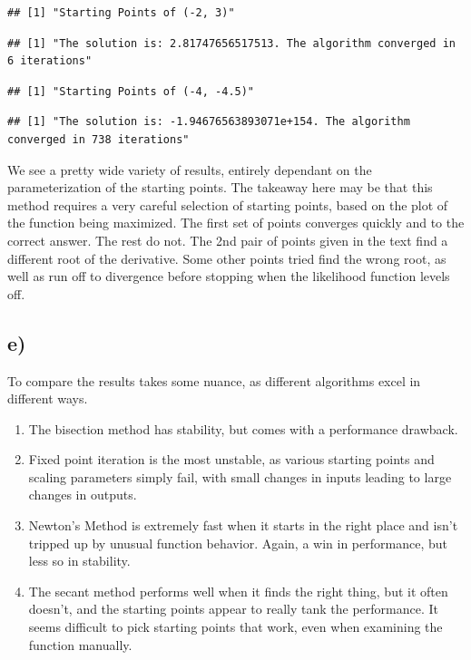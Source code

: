 \documentclass[]{article}
\begin{document}
\begin{verbatim}
## [1] "Starting Points of (-2, 3)"
\end{verbatim}

\begin{verbatim}
## [1] "The solution is: 2.81747656517513. The algorithm converged in 6 iterations"
\end{verbatim}

\begin{verbatim}
## [1] "Starting Points of (-4, -4.5)"
\end{verbatim}

\begin{verbatim}
## [1] "The solution is: -1.94676563893071e+154. The algorithm converged in 738 iterations"
\end{verbatim}

We see a pretty wide variety of results, entirely dependant on the
parameterization of the starting points. The takeaway here may be that
this method requires a very careful selection of starting points, based
on the plot of the function being maximized. The first set of points
converges quickly and to the correct answer. The rest do not. The 2nd
pair of points given in the text find a different root of the
derivative. Some other points tried find the wrong root, as well as run
off to divergence before stopping when the likelihood function levels
off.

\subsection{e)}\label{e}

To compare the results takes some nuance, as different algorithms excel
in different ways.

\begin{enumerate}
\def\labelenumi{\arabic{enumi}.}
\item
  The bisection method has stability, but comes with a performance
  drawback.
\item
  Fixed point iteration is the most unstable, as various starting points
  and scaling parameters simply fail, with small changes in inputs
  leading to large changes in outputs.
\item
  Newton's Method is extremely fast when it starts in the right place
  and isn't tripped up by unusual function behavior. Again, a win in
  performance, but less so in stability.
\item
  The secant method performs well when it finds the right thing, but it
  often doesn't, and the starting points appear to really tank the
  performance. It seems difficult to pick starting points that work,
  even when examining the function manually.
\end{enumerate}
\end{document}
